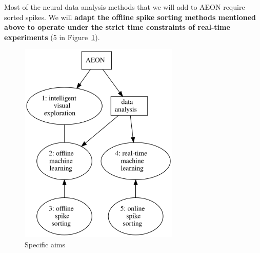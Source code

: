 Most of the neural data analysis methods that we will add to AEON require
sorted spikes. We will \textbf{adapt the offline spike sorting methods
mentioned above to operate under the strict time constraints of real-time
experiments} (5 in Figure~\ref{fig:aims}).

\begin{figure}
    \begin{center}
        \includegraphics[width=3in]{figures/aims.png}
    \end{center}
    \caption{Specific aims}
    \label{fig:aims}
\end{figure}

